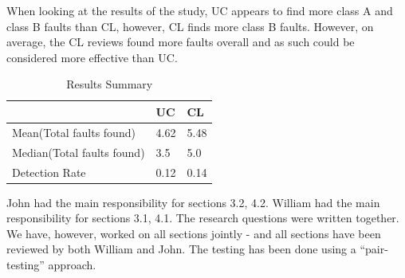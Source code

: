\documentclass[10pt,twocolumn]{article}
\begin{document}
When looking at the results of the study, UC appears to find more class A and class B faults than CL, however, CL finds more class B faults. However, on average, the CL reviews found more faults overall and as such could be considered more effective than UC. 

\begin{table}
	\centering
	\begin{tabular}[ht]{|l|l|l|}
	\hline
	& UC & CL \\
	\hline
	Mean(Total faults found) & 4.62 & 5.48 \\
	\hline
	Median(Total faults found) & 3.5 & 5.0 \\
	\hline
	Detection Rate & 0.12 & 0.14 \\
	\hline
	\end{tabular}
	\caption{Results Summary}
\end{table}







John had the main responsibility for sections 3.2, 4.2. William had the main responsibility for sections 3.1, 4.1. The research questions were written together. We have, however, worked on all sections jointly - and all sections have been reviewed by both William and John. The testing has been done using a ``pair-testing'' approach. \newline
\end{document}
